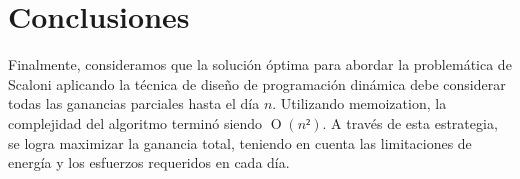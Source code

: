\section{Conclusiones}

Finalmente, consideramos que la solución óptima para abordar la problemática de Scaloni aplicando la técnica de diseño
de programación dinámica debe considerar todas las ganancias parciales hasta el día $n$. Utilizando memoization,
la complejidad del algoritmo terminó siendo $\operatorname{O}(n²)$.
A través de esta estrategia, se logra maximizar la ganancia total, teniendo en cuenta las limitaciones de energía y los 
esfuerzos requeridos en cada día. 
